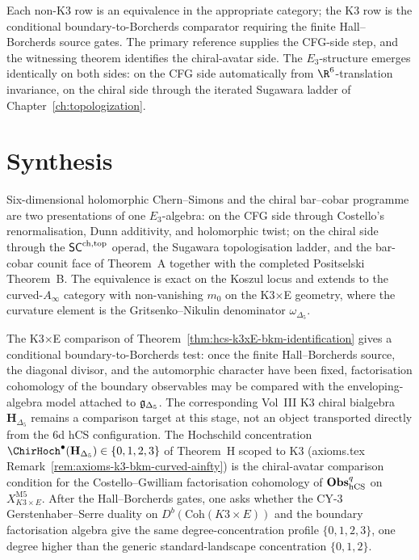 Each non-K3 row is an equivalence in the appropriate category; the K3
row is the conditional boundary-to-Borcherds comparator requiring the
finite Hall--Borcherds source gates. The primary reference supplies the
CFG-side step, and the witnessing theorem identifies the
chiral-avatar side. The $E_3$-structure emerges
identically on both sides: on the CFG side automatically from
$\R^6$-translation invariance, on the chiral side through the iterated
Sugawara ladder of Chapter~\ref{ch:topologization}.

\section{Synthesis}
\label{sec:hcs-synthesis}

Six-dimensional holomorphic Chern--Simons and the chiral bar--cobar
programme are two presentations of one $E_3$-algebra: on the CFG side
through Costello's renormalisation, Dunn additivity, and
holomorphic twist; on the chiral side through the
$\mathsf{SC}^{\mathrm{ch},\mathrm{top}}$ operad, the Sugawara topologisation ladder, and the
bar-cobar counit face of Theorem~A together with the completed
Positselski Theorem~B. The equivalence is exact on the
Koszul locus and extends to the curved-$A_\infty$ category with
non-vanishing $m_0$ on the K3$\times$E geometry, where the curvature
element is the Gritsenko--Nikulin denominator
$\omega_{\Delta_5}$.

The K3$\times$E comparison of
Theorem~\ref{thm:hcs-k3xE-bkm-identification} gives a conditional
boundary-to-Borcherds test: once the finite Hall--Borcherds source,
the diagonal divisor, and the automorphic character have been fixed,
factorisation cohomology of the boundary observables may be compared
with the enveloping-algebra model attached to $\mathfrak{g}_{\Delta_5}$. The
corresponding Vol~III K3 chiral bialgebra
$\mathbf H_{\Delta_5}$ remains a comparison target at this stage,
not an object transported directly from the 6d hCS configuration. The
Hochschild concentration
$\ChirHoch^\bullet(\mathbf H_{\Delta_5}) \in \{0,1,2,3\}$ of
Theorem~H scoped to K3 (axioms.tex
Remark~\ref{rem:axioms-k3-bkm-curved-ainfty}) is the chiral-avatar
comparison condition for the Costello--Gwilliam factorisation
cohomology of $\mathbf{Obs}^q_{\mathrm{hCS}}$ on $X_{K3\times E}^{\mathrm{M5}}$.
After the Hall--Borcherds gates, one asks whether the CY-$3$
Gerstenhaber--Serre duality on $D^b(\mathrm{Coh}(K3\times E))$ and
the boundary factorisation algebra give the same degree-concentration
profile $\{0,1,2,3\}$, one degree higher than the generic
standard-landscape concentration $\{0,1,2\}$.

